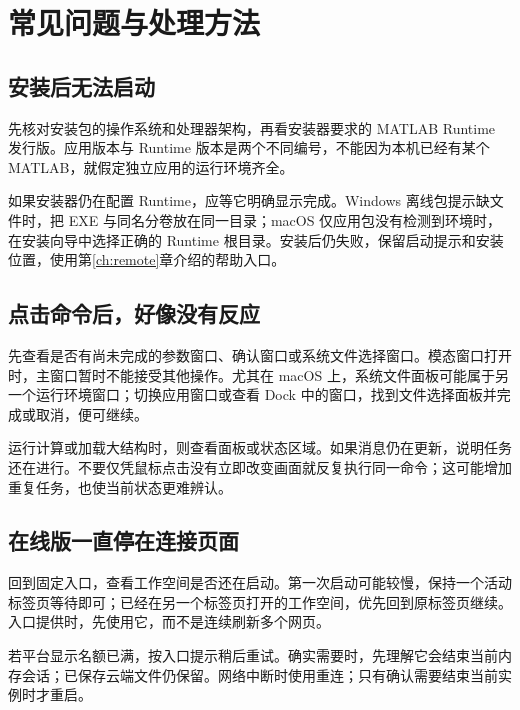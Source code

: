 \chapter{常见问题与处理方法}\label{ch:troubleshooting}


\section{安装后无法启动}

先核对安装包的操作系统和处理器架构，再看安装器要求的 MATLAB\regmark{} Runtime 发行版。应用版本与 Runtime 版本是两个不同编号，不能因为本机已经有某个 MATLAB\regmark{}，就假定独立应用的运行环境齐全。

如果安装器仍在配置 Runtime，应等它明确显示完成。Windows 离线包提示缺文件时，把 EXE 与同名分卷放在同一目录；macOS 仅应用包没有检测到环境时，在安装向导中选择正确的 Runtime 根目录。安装后仍失败，保留启动提示和安装位置，使用第\ref{ch:remote}章介绍的帮助入口。

\section{点击命令后，好像没有反应}

先查看是否有尚未完成的参数窗口、确认窗口或系统文件选择窗口。模态窗口打开时，主窗口暂时不能接受其他操作。尤其在 macOS 上，系统文件面板可能属于另一个运行环境窗口；切换应用窗口或查看 Dock 中的窗口，找到文件选择面板并完成或取消，便可继续。

运行计算或加载大结构时，则查看面板或状态区域。如果消息仍在更新，说明任务还在进行。不要仅凭鼠标点击没有立即改变画面就反复执行同一命令；这可能增加重复任务，也使当前状态更难辨认。

\section{在线版一直停在连接页面}

回到固定入口，查看工作空间是否还在启动。第一次启动可能较慢，保持一个活动标签页等待即可；已经在另一个标签页打开的工作空间，优先回到原标签页继续。入口提供时，先使用它，而不是连续刷新多个网页。

若平台显示名额已满，按入口提示稍后重试。确实需要时，先理解它会结束当前内存会话；已保存云端文件仍保留。网络中断时使用重连；只有确认需要结束当前实例时才重启。

